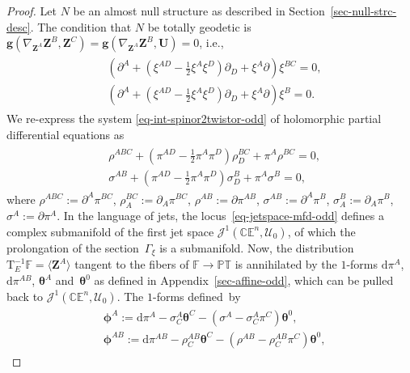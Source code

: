 \documentclass[10pt,a4paper]{amsart}
\numberwithin{equation}{section}
\newcommand{\mc} [1]{\mathcal{#1}}
\newcommand{\dd} {\mathrm{d}}
\newcommand{\Tgt} {\mathrm{T}}
\newcommand{\PT} {\mathbb{PT}}
\newcommand{\E} {\mathbb{E}}
\newcommand{\C} {\mathbb{C}}
\newcommand{\F} {\mathbb{F}}
\begin{document}
\begin{proof}Let $N$ be an almost null structure as described in Section~\ref{sec-null-strc-desc}. The condition that $N$ be totally geodetic is $\bm{g} ( \nabla_{\bm{Z}^{A}} \bm{Z}^{B} , \bm{Z}^{C} ) = \bm{g} ( \nabla_{\bm{Z}^{A}} \bm{Z}^{B} , \bm{U} ) = 0$, i.e.,
\begin{gather}\label{eq-int-spinor2twistor-odd}\begin{split}
& \left( \partial ^{A} + \left( \xi^{AD} - \tfrac{1}{2} \xi^{A} \xi^{D} \right) \partial _{D} + \xi^{A} \partial \right) \xi^{BC} = 0 , \\
& \left( \partial ^{A} + \left( \xi^{AD} - \tfrac{1}{2} \xi^{A} \xi^{D} \right) \partial _{D} + \xi^{A} \partial \right) \xi^{B} = 0 .
\end{split}
\end{gather}
We re-express the system \eqref{eq-int-spinor2twistor-odd} of holomorphic partial dif\/ferential equations as
\begin{gather}\label{eq-jetspace-mfd-odd}
\begin{split}
& \rho^{ABC} + \left( \pi^{AD} - \tfrac{1}{2} \pi^{A} \pi^{D} \right) \rho_{D}^{BC} + \pi^{A} \rho^{BC} = 0 , \\
& \sigma^{AB} + \left( \pi^{AD} - \tfrac{1}{2} \pi^{A} \pi^{D} \right) \sigma_{D}^{B} + \pi^{A} \sigma^{B} = 0 ,
\end{split}
\end{gather}
where $\rho^{ABC}:=\partial^{A} \pi^{BC} $, $\rho_{A}^{BC} :=\partial_{A} \pi^{BC}$, $\rho^{AB}:=\partial \pi^{AB}$, $\sigma^{AB}:=\partial^{A} \pi^{B}$, $\sigma_{A}^{B} :=\partial_{A} \pi^{B}$, $\sigma^{A}:=\partial \pi^{A}$. In the language of jets, the locus~\eqref{eq-jetspace-mfd-odd} def\/ines a complex submanifold of the f\/irst jet space $\mc{J}^1 (\C \E^n,\mc{U}_0)$, of which the prolongation of the section~$\Gamma_\xi$ is a submanifold. Now, the distribution $\Tgt^{-1}_E \F = \langle \bm{Z}^A \rangle$ tangent to the f\/ibers of $\F \rightarrow \PT$ is annihilated by the $1$-forms $\dd \pi^A$, $\dd \pi^{AB}$, $\bm{\theta}^A$ and~$\bm{\theta}^0$ as def\/ined in Appendix~\ref{sec-affine-odd}, which can be pulled back to $\mc{J}^1 (\C \E^n,\mc{U}_0)$. The $1$-forms def\/ined~by
\begin{gather}
\begin{split}
& \bm{\phi}^A := \dd \pi^{A} - \sigma_{C}^{A} \bm{\theta}^C - \left( \sigma^{A} - \sigma_{C}^{A} \pi^{C} \right) \bm{\theta}^0 , \\
& \bm{\phi}^{AB} := \dd \pi^{AB} - \rho_{C}^{AB} \bm{\theta}^C - \left( \rho^{AB} - \rho_{C}^{AB} \pi^C \right) \bm{\theta}^0 ,

\end{split}
\end{gather}
\end{proof}
\end{document}
